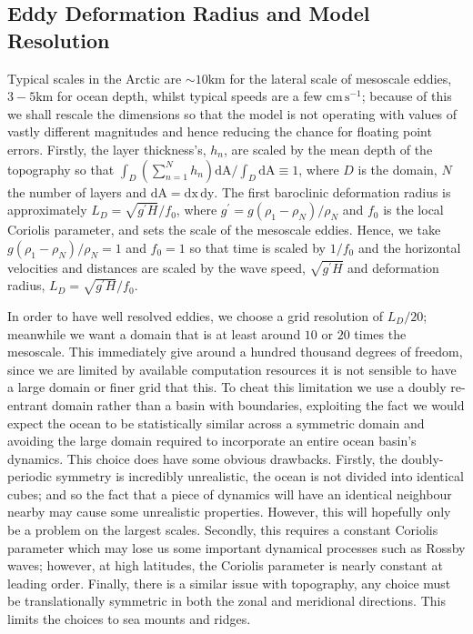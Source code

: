 \documentclass[12pt,a4paper]{report}
\begin{document}
  
  
  \subsection{Eddy Deformation Radius and Model Resolution}
  
  Typical scales in the Arctic are $\sim 10 \mathrm{km}$ for
  the lateral scale of mesoscale eddies,
  $3-5 \mathrm{km}$ for ocean depth, whilst typical speeds are a few
  $\mathrm{cm}\,\mathrm{s}^{-1}$; because of this we shall rescale the 
  dimensions so that the model is not operating with values of vastly different magnitudes
  and hence reducing the chance for floating point errors. Firstly, the layer thickness's,
  $h_{n}$, are scaled by the mean depth of the topography so that 
  $ \int_{D} \left(\sum_{n=1}^{N} h_{n}\right)  \mathrm{ d A} / \int_{D} \mathrm{ d A} \equiv 1 $, 
  where $D$  is the domain, $N$ the number of layers and
  $ \mathrm{ d A} = \mathrm{ d x}\, \mathrm{ d y}$. 
  The first baroclinic deformation radius is approximately $L_{D}=\sqrt{g^{\prime}H}/f_{0}$,
  where ${g^{\prime}=g\left(\rho_{1}-\rho_{N}\right)}/\rho_{N}$ and $f_{0}$ is 
  the local Coriolis parameter, and sets the scale of the mesoscale eddies.
  Hence, we take ${g\left(\rho_{1}-\rho_{N}\right)}/\rho_{N} = 1 $
  and $f_{0}=1$ so that time is scaled by $1/f_{0}$ and the horizontal velocities and distances are scaled by the wave speed, $\sqrt{g^{\prime}H}$ and deformation radius, $L_{D}=\sqrt{g^{\prime}H}/f_{0}$.

  In order to have well resolved eddies, we choose a grid resolution of $ L_{D} / 20$;
  meanwhile we want a domain that is at least around $10$ or $20$ times the 
  mesoscale. This immediately give around a hundred thousand degrees of freedom,
  since we are limited by available computation resources it is not sensible
  to have a large domain or finer grid that this. To cheat this limitation
  we use a doubly re-entrant domain rather than a basin with boundaries, exploiting
  the fact we would expect the ocean to be statistically similar across a symmetric 
  domain and avoiding the large domain required to incorporate an entire ocean basin's
  dynamics. This choice does have some obvious drawbacks. Firstly, the doubly-periodic symmetry is
  incredibly unrealistic, the ocean is not divided into identical cubes; and so the 
  fact that a piece of dynamics will have an identical neighbour nearby may cause some
  unrealistic properties. However, this will hopefully only be a problem on the largest 
  scales. Secondly, this requires a constant Coriolis parameter which may lose
  us some important dynamical processes such as Rossby waves; however, at high latitudes, the Coriolis parameter is nearly constant
  at leading order.
  Finally, there is a similar issue with topography, any choice must be
  translationally symmetric in both the zonal and meridional directions. This limits the choices to sea mounts and ridges.  
  
\end{document}
